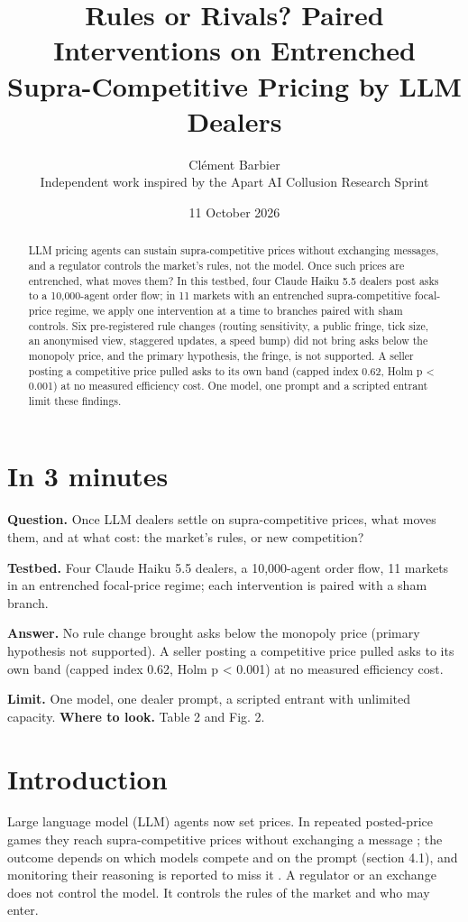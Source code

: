 \documentclass[11pt,a4paper]{article}
\title{Rules or Rivals? Paired Interventions on Entrenched Supra-Competitive Pricing by LLM Dealers}
\author{Cl\'ement Barbier\\[2pt]\small Independent work inspired by the Apart AI Collusion Research Sprint}
\date{11 October 2026}
\newif\ifclaimtags
\newcommand{\claim}[1]{\ifclaimtags\textsuperscript{[#1]}\fi}
\begin{document}
\maketitle

\begin{abstract}
LLM pricing agents can sustain supra-competitive prices without exchanging messages, and a regulator controls the market's rules, not the model. Once such prices are entrenched, what moves them? In this testbed, four Claude Haiku 5.5 dealers post asks to a 10,000-agent order flow; in 11 markets with an entrenched supra-competitive focal-price regime\claim{C3a}, we apply one intervention at a time to branches paired with sham controls. Six pre-registered rule changes (routing sensitivity, a public fringe, tick size, an anonymised view, staggered updates, a speed bump) did not bring asks below the monopoly price, and the primary hypothesis, the fringe, is not supported\claim{C3a}. A seller posting a competitive price pulled asks to its own band (capped index 0.62, Holm p < 0.001) at no measured efficiency cost\claim{C3b}. One model, one prompt and a scripted entrant limit these findings.

\end{abstract}
\section*{In 3 minutes}
\textbf{Question.} Once LLM dealers settle on supra-competitive prices, what moves them, and at what cost: the market's rules, or new competition?

\textbf{Testbed.} Four Claude Haiku 5.5 dealers, a 10,000-agent order flow, 11 markets in an entrenched focal-price regime\claim{C3a}; each intervention is paired with a sham branch.

\textbf{Answer.} No rule change brought asks below the monopoly price (primary hypothesis not supported)\claim{C3a}. A seller posting a competitive price pulled asks to its own band (capped index 0.62, Holm p < 0.001) at no measured efficiency cost\claim{C3b}.

\textbf{Limit.} One model, one dealer prompt, a scripted entrant with unlimited capacity. \textbf{Where to look.} Table 2 and Fig. 2.

\section{Introduction}
Large language model (LLM) agents now set prices. In repeated posted-price games they reach supra-competitive prices without exchanging a message \citep{fish2024}; the outcome depends on which models compete \citep{lee2026} and on the prompt (section 4.1), and monitoring their reasoning is reported to miss it \citep{leepark2026}. A regulator or an exchange does not control the model. It controls the rules of the market and who may enter.
\end{document}
